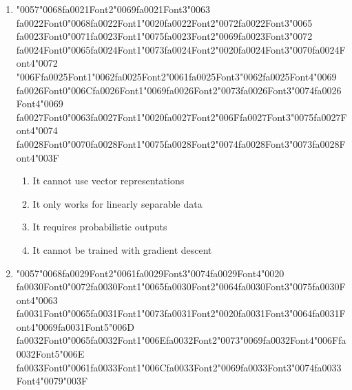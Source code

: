 \documentclass[12pt]{article}
\begin{document}
\begin{enumerate}[label=Q\arabic*.]
\begin{enumerate}[label=(\Alph*)]
\end{enumerate}
\item {\char"0057}{\char"0068}{\csname fa0021Font2\endcsname\char"0069}{\csname fa0021Font3\endcsname\char"0063} {\csname fa0022Font0\endcsname\char"0068}{\csname fa0022Font1\endcsname\char"0020}{\csname fa0022Font2\endcsname\char"0072}{\csname fa0022Font3\endcsname\char"0065} {\csname fa0023Font0\endcsname\char"0071}{\csname fa0023Font1\endcsname\char"0075}{\csname fa0023Font2\endcsname\char"0069}{\csname fa0023Font3\endcsname\char"0072} {\csname fa0024Font0\endcsname\char"0065}{\csname fa0024Font1\endcsname\char"0073}{\csname fa0024Font2\endcsname\char"0020}{\csname fa0024Font3\endcsname\char"0070}{\csname fa0024Font4\endcsname\char"0072} {\char"006F}{\csname fa0025Font1\endcsname\char"0062}{\csname fa0025Font2\endcsname\char"0061}{\csname fa0025Font3\endcsname\char"0062}{\csname fa0025Font4\endcsname\char"0069} {\csname fa0026Font0\endcsname\char"006C}{\csname fa0026Font1\endcsname\char"0069}{\csname fa0026Font2\endcsname\char"0073}{\csname fa0026Font3\endcsname\char"0074}{\csname fa0026Font4\endcsname\char"0069} {\csname fa0027Font0\endcsname\char"0063}{\csname fa0027Font1\endcsname\char"0020}{\csname fa0027Font2\endcsname\char"006F}{\csname fa0027Font3\endcsname\char"0075}{\csname fa0027Font4\endcsname\char"0074} {\csname fa0028Font0\endcsname\char"0070}{\csname fa0028Font1\endcsname\char"0075}{\csname fa0028Font2\endcsname\char"0074}{\csname fa0028Font3\endcsname\char"0073}{\csname fa0028Font4\endcsname\char"003F}
\begin{enumerate}[label=(\Alph*)]
    \item It cannot use vector representations
    \item It only works for linearly separable data
    \item It requires probabilistic outputs
    \item It cannot be trained with gradient descent
\end{enumerate}
\item {\char"0057}{\char"0068}{\csname fa0029Font2\endcsname\char"0061}{\csname fa0029Font3\endcsname\char"0074}{\csname fa0029Font4\endcsname\char"0020} {\csname fa0030Font0\endcsname\char"0072}{\csname fa0030Font1\endcsname\char"0065}{\csname fa0030Font2\endcsname\char"0064}{\csname fa0030Font3\endcsname\char"0075}{\csname fa0030Font4\endcsname\char"0063} {\csname fa0031Font0\endcsname\char"0065}{\csname fa0031Font1\endcsname\char"0073}{\csname fa0031Font2\endcsname\char"0020}{\csname fa0031Font3\endcsname\char"0064}{\csname fa0031Font4\endcsname\char"0069}{\csname fa0031Font5\endcsname\char"006D} {\csname fa0032Font0\endcsname\char"0065}{\csname fa0032Font1\endcsname\char"006E}{\csname fa0032Font2\endcsname\char"0073}{\char"0069}{\csname fa0032Font4\endcsname\char"006F}{\csname fa0032Font5\endcsname\char"006E} {\csname fa0033Font0\endcsname\char"0061}{\csname fa0033Font1\endcsname\char"006C}{\csname fa0033Font2\endcsname\char"0069}{\csname fa0033Font3\endcsname\char"0074}{\csname fa0033Font4\endcsname\char"0079}{\char"003F}

\end{enumerate}
\end{document}
